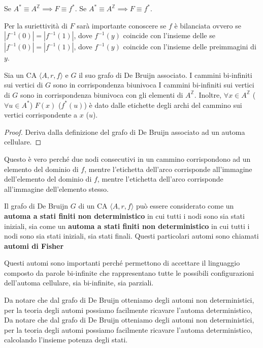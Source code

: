 \begin{nota}
    Se $A^\ast\equiv A^\mathbb{Z}\implies F \equiv f^\ast$.
    Se $A^\ast\equiv A^\mathbb{Z}\implies F \equiv f^\ast$.
\end{nota}

\begin{nota}
    Per la suriettività di $F$ sarà importante conoscere se $f$ è bilanciata ovvero
    se $|f^{-1}(0)| =|f^{-1}(1)|$, dove $  f^{-1}(y)$ coincide con l'insieme delle
    se $|f^{-1}(0)| =|f^{-1}(1)|$, dove $  f^{-1}(y)$ coincide con l'insieme delle
    preimmagini di $y$.
\end{nota}

\begin{nota}
    Sia un CA $\langle A,r,f\rangle$ e $G$ il suo grafo di De Bruijn associato.
    I cammini bi-infiniti sui vertici di $G$ sono in corrispondenza biunivoca
    I cammini bi-infiniti sui vertici di $G$ sono in corrispondenza biunivoca
    con gli elementi di $A^\mathbb{Z}$. Inoltre, $\forall x\in A^\mathbb{Z}$ ($ \forall u\in A^\ast$)
    $F(x)$ ($f^\ast(u)$) è dato dalle etichette degli archi del cammino sui vertici
    corrispondente a $x$ ($u$).
    \begin{proof}
        Deriva dalla definizione del grafo di De Bruijn associato ad un automa cellulare.
    \end{proof}
\end{nota}

Questo è vero perché due nodi consecutivi in un cammino corrispondono ad un elemento
del dominio di $f$, mentre l'etichetta dell'arco corrisponde all'immagine dell'elemento
del dominio di $f$, mentre l'etichetta dell'arco corrisponde all'immagine dell'elemento
stesso.

\begin{nota}
    Il grafo di De Bruijn $G$ di un CA $\langle A,r,f\rangle$ può essere considerato
    come un \textbf{automa a stati finiti non deterministico} in cui tutti i nodi sono sia stati iniziali, sia
    come un \textbf{automa a stati finiti non deterministico} in cui tutti i nodi sono sia stati iniziali, sia
    stati finali. Questi particolari automi sono chiamati \textbf{automi di Fisher}
\end{nota}

Questi automi sono importanti perché permettono di accettare il linguaggio composto
da parole bi-infinite che rappresentano tutte le possibili configurazioni dell'automa
cellulare, sia bi-infinite, sia parziali.

Da notare che dal grafo di De Bruijn otteniamo degli automi non deterministici,
per la teoria degli automi possiamo facilmente ricavare l'automa deterministico,
Da notare che dal grafo di De Bruijn otteniamo degli automi non deterministici,
per la teoria degli automi possiamo facilmente ricavare l'automa deterministico,
calcolando l'insieme potenza degli stati.

